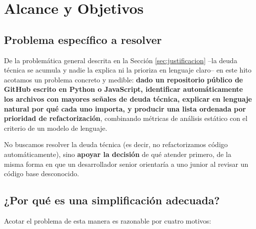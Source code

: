 \section{Alcance y Objetivos}
\label{sec:alcance}

\subsection{Problema específico a resolver}

De la problemática general descrita en la Sección \ref{sec:justificacion} --la deuda técnica se acumula y nadie la explica ni la prioriza en lenguaje claro-- en este hito acotamos un problema concreto y medible: \textbf{dado un repositorio público de GitHub escrito en Python o JavaScript, identificar automáticamente los archivos con mayores señales de deuda técnica, explicar en lenguaje natural por qué cada uno importa, y producir una lista ordenada por prioridad de refactorización}, combinando métricas de análisis estático con el criterio de un modelo de lenguaje.

No buscamos resolver la deuda técnica (es decir, no refactorizamos código automáticamente), sino \textbf{apoyar la decisión} de qué atender primero, de la misma forma en que un desarrollador senior orientaría a uno junior al revisar un código base desconocido.

\subsection{¿Por qué es una simplificación adecuada?}

Acotar el problema de esta manera es razonable por cuatro motivos:

